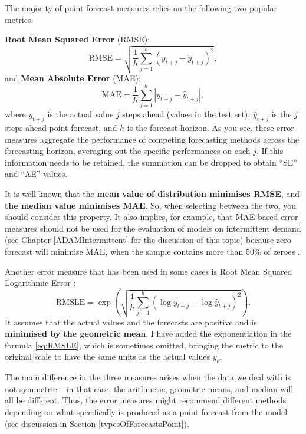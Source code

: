 \documentclass[
]{book}
\theoremstyle{definition}
\theoremstyle{definition}
\theoremstyle{definition}
\theoremstyle{definition}
\theoremstyle{remark}
\begin{document}
The majority of point forecast measures relies on the following two popular metrics:

\textbf{Root Mean Squared Error} (RMSE):
\begin{equation}
    \mathrm{RMSE} = \sqrt{\frac{1}{h} \sum_{j=1}^h \left( y_{t+j} -\hat{y}_{t+j} \right)^2 },
    \label{eq:RMSE}
\end{equation}
and \textbf{Mean Absolute Error} (MAE):
\begin{equation}
    \mathrm{MAE} = \frac{1}{h} \sum_{j=1}^h \left| y_{t+j} -\hat{y}_{t+j} \right| ,
    \label{eq:MAE}
\end{equation}
where \(y_{t+j}\) is the actual value \(j\) steps ahead (values in the test set), \(\hat{y}_{t+j}\) is the \(j\) steps ahead point forecast, and \(h\) is the forecast horizon. As you see, these error measures aggregate the performance of competing forecasting methods across the forecasting horizon, averaging out the specific performances on each \(j\). If this information needs to be retained, the summation can be dropped to obtain ``SE'' and ``AE'' values.

It is well-known \citep[see, for example,][]{Kolassa2016} that the \textbf{mean value of distribution minimises RMSE}, and \textbf{the median value minimises MAE}. So, when selecting between the two, you should consider this property. It also implies, for example, that MAE-based error measures should not be used for the evaluation of models on intermittent demand (see Chapter \ref{ADAMIntermittent} for the discussion of this topic) because zero forecast will minimise MAE, when the sample contains more than 50\% of zeroes \citep[see, for example,][]{Wallstrom2010}.

Another error measure that has been used in some cases is Root Mean Squared Logarithmic Error \citep[RMSLE, see discussion in][]{Tofallis2015}:
\begin{equation}
    \mathrm{RMSLE} = \exp\left(\sqrt{\frac{1}{h} \sum_{j=1}^h \left( \log y_{t+j} -\log \hat{y}_{t+j} \right)^2} \right).
    \label{eq:RMSLE}
\end{equation}
It assumes that the actual values and the forecasts are positive and is \textbf{minimised by the geometric mean}. I have added the exponentiation in the formula \eqref{eq:RMSLE}, which is sometimes omitted, bringing the metric to the original scale to have the same units as the actual values \(y_t\).

The main difference in the three measures arises when the data we deal with is not symmetric -- in that case, the arithmetic, geometric means, and median will all be different. Thus, the error measures might recommend different methods depending on what specifically is produced as a point forecast from the model (see discussion in Section \ref{typesOfForecastsPoint}).
\end{document}
